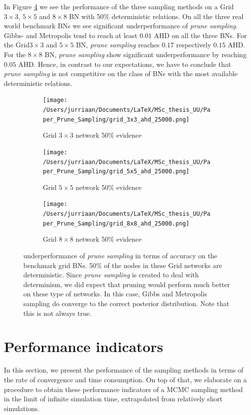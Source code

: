 \documentclass[a4paper, twoside, 11pt]{report}
\theoremstyle{plain}
\theoremstyle{definition}
\theoremstyle{remark}
\newcommand{\ps}{\textit{prune sampling }}
\newcommand{\psp}{\textit{prune sampling. }}
\begin{document}
In Figure \ref{results3} we see the performance of the three sampling methods on a Grid $3 \times 3$, $5 \times 5$ and $8 \times 8$ BN with 50\% deterministic relations. On all the three real world benchmark BNs we see significant underperformance of \psp Gibbs- and Metropolis tend to reach at least $0.01$ AHD on all the three BNs. For the Grid$ 3 \times 3$ and $5 \times 5$ BN, \ps reaches $0.17$ respectively $0.15$ AHD. For the $8 \times 8$ BN, \ps show significant underperformance by reaching $0.05$ AHD. Hence, in contrast to our expectations, we have to conclude that \ps is not competitive on the class of BNs with the most available deterministic relations.
\begin{figure}[H]
\centering
\begin{subfigure}{0.49\textwidth}
\texttt{[image: /Users/jurriaan/Documents/LaTeX/MSc\_thesis\_UU/Paper\_Prune\_Sampling/grid\_3x3\_ahd\_25000.png]}
\caption{Grid $3 \times 3$ network 50\% evidence}%
\label{grid_3x3}%
\end{subfigure}\hfill%
\begin{subfigure}{0.49\textwidth}
\texttt{[image: /Users/jurriaan/Documents/LaTeX/MSc\_thesis\_UU/Paper\_Prune\_Sampling/grid\_5x5\_ahd\_25000.png]}
\caption{Grid $5 \times 5$ network 50\% evidence}%
\label{grid_5x5}%
\end{subfigure}
\begin{subfigure}{0.49\textwidth}
\texttt{[image: /Users/jurriaan/Documents/LaTeX/MSc\_thesis\_UU/Paper\_Prune\_Sampling/grid\_8x8\_ahd\_25000.png]}
\caption{Grid $8 \times 8$ network 50\% evidence}%
\label{grid_8x8}%
\end{subfigure}\hfill%
\caption{underperformance of \ps in terms of accuracy on the benchmark grid BNs. 50\% of the nodes in these Grid networks are deterministic. Since \ps is created to deal with determinism, we did expect that pruning would perform much better on these type of networks. In this case, Gibbs and Metropolis sampling do converge to the correct posterior distribution. Note that this is not always true.}
\label{results3}
\end{figure}


\section{Performance indicators}
In this section, we present the performance of the sampling methods in terms of the rate of convergence and time consumption. On top of that, we elaborate on a procedure to obtain these performance indicators of a MCMC sampling method in the limit of infinite simulation time, extrapolated from relatively short simulations.
\end{document}
